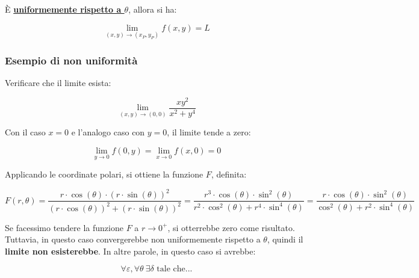 \documentclass[a4paper]{article}
\begin{document}
	\noindent
	È \textcolor{Red3}{\textbf{\underline{uniformemente rispetto a $\theta$}}}, allora si ha:
	
	\begin{equation*}
		\lim_{\left(x,y\right) \rightarrow \left(x_{P}, y_{P}\right)} f\left(x,y\right) = L
	\end{equation*}

	\newpage
	
	\subsubsection[Esempio di non uniformità]{\textcolor{Green4}{Esempio di non uniformità}}
	
	Verificare che il limite esista:
	
	\begin{equation*}
		\lim_{\left(x,y\right) \rightarrow \left(0,0\right)} \dfrac{xy^{2}}{x^{2} + y^{4}}
	\end{equation*}

	\noindent
	Con il caso $x=0$ e l'analogo caso con $y=0$, il limite tende a zero:
	
	\begin{equation*}
		\lim_{y \rightarrow 0} f\left(0,y\right) = \lim_{x \rightarrow 0} f\left(x,0\right) = 0
	\end{equation*}

	\noindent
	Applicando le coordinate polari, si ottiene la funzione $F$, definita:
	
	\begin{equation*}
		F\left(r,\theta\right) = \dfrac{r \cdot \cos\left(\theta\right) \cdot \left(r \cdot \sin\left(\theta\right)\right)^{2}}{\left(r \cdot \cos\left(\theta\right)\right)^{2} + \left(r \cdot \sin\left(\theta\right)\right)^{2}} = \dfrac{r^{3} \cdot \cos\left(\theta\right) \cdot \sin^{2}\left(\theta\right)}{r^{2} \cdot \cos^{2}\left(\theta\right) + r^{4} \cdot \sin^{4}\left(\theta\right)} = \dfrac{r \cdot \cos\left(\theta\right) \cdot \sin^{2}\left(\theta\right)}{\cos^{2}\left(\theta\right) + r^{2} \cdot \sin^{4}\left(\theta\right)}
	\end{equation*}

	\noindent
	Se facessimo tendere la funzione $F$ a $r \rightarrow 0^{+}$, si otterrebbe zero come risultato. Tuttavia, in questo caso convergerebbe non uniformemente rispetto a $\theta$, quindi il \textbf{limite non esisterebbe}. In altre parole, in questo caso si avrebbe:
	
	\begin{equation*}
		\forall\varepsilon, \forall\theta \: \exists\delta \text{ tale che...}
	\end{equation*}
\end{document}
